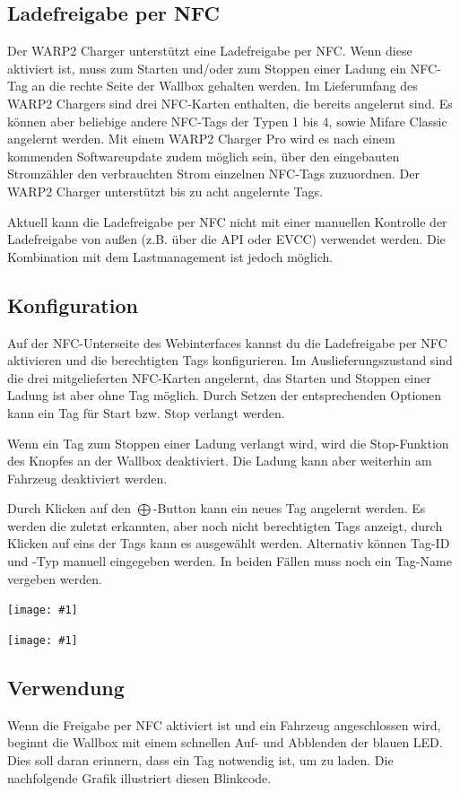 \documentclass[a4paper,10pt]{article}
\newcommand{\hint}[1]{\begin{tcolorbox}[colback=boxgray,colframe=black,coltext=
white,title=Hinweis,left*=2mm,right*=2mm,boxsep=1mm,bottom=1mm,top=1mm]#1\end{tcolorbox}}
\newcommand{\gfx}[1]{\texttt{[image: \#1]}}
\begin{document}
\begin{multicols*}{2}
	\section{Ladefreigabe per NFC}
	\label{NFC}
	Der WARP2 Charger unterstützt eine Ladefreigabe per NFC. Wenn diese aktiviert ist,
	muss zum Starten und/oder zum Stoppen einer Ladung ein NFC-Tag an die rechte Seite
	der Wallbox gehalten werden. Im Lieferumfang des WARP2 Chargers sind drei NFC-Karten enthalten,
	die bereits angelernt sind. Es können aber beliebige andere NFC-Tags der Typen 1 bis 4,
	sowie Mifare Classic angelernt werden. Mit einem WARP2 Charger Pro wird es nach einem
	kommenden Softwareupdate zudem möglich sein, über den eingebauten Stromzähler
	den verbrauchten Strom einzelnen NFC-Tags zuzuordnen.
	Der WARP2 Charger unterstützt bis zu acht angelernte Tags.
	\hint{Aktuell kann die Ladefreigabe per NFC nicht mit einer manuellen Kontrolle der
	Ladefreigabe von außen (z.B. über die API oder EVCC) verwendet werden.
	Die Kombination mit dem Lastmanagement ist jedoch möglich.}

	\subsection{Konfiguration}
	Auf der NFC-Unterseite des Webinterfaces kannst du die Ladefreigabe per NFC aktivieren
	und die berechtigten Tags konfigurieren. Im Auslieferungszustand sind die
	drei mitgelieferten NFC-Karten angelernt, das Starten und Stoppen einer Ladung ist aber ohne Tag möglich.
	Durch Setzen der entsprechenden Optionen kann ein Tag für Start bzw. Stop verlangt werden.
	\hint{Wenn ein Tag zum Stoppen einer Ladung verlangt wird,
	wird die Stop-Funktion des Knopfes an der Wallbox deaktiviert.
	Die Ladung kann aber weiterhin am Fahrzeug deaktiviert werden.}


	Durch Klicken auf den $\bigoplus$-Button kann ein neues Tag angelernt werden.
	Es werden die zuletzt erkannten, aber noch nicht berechtigten Tags anzeigt,
	durch Klicken auf eins der Tags kann es ausgewählt werden. Alternativ können
	Tag-ID und -Typ manuell eingegeben werden. In beiden Fällen muss noch ein Tag-Name vergeben werden.

	\gfx{./img_warp2/resized/web_nfc}

	\gfx{./img_warp2/resized/web_nfc_new}

	\subsection{Verwendung}
	Wenn die Freigabe per NFC aktiviert ist und ein Fahrzeug angeschlossen wird,
	beginnt die Wallbox mit einem schnellen Auf- und Abblenden der blauen LED.
	Dies soll daran erinnern, dass ein Tag notwendig ist, um zu laden. Die
	nachfolgende Grafik illustriert diesen Blinkcode.


\end{multicols*}
\end{document}
